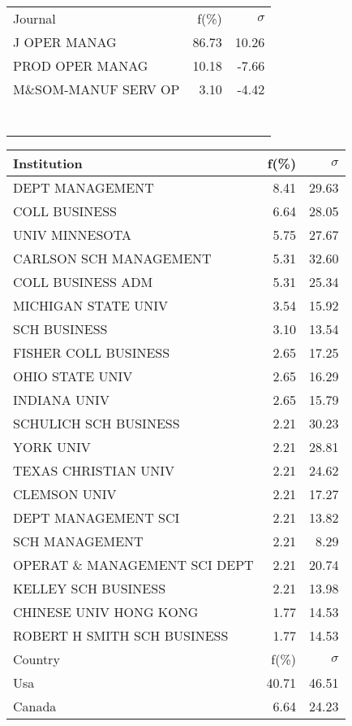 \documentclass[a4paper,11pt]{report}
\begin{document}
\begin{landscape}
\begin{table}[!ht]
{\begin{tabular}{|l r  r|}
 &  & \\
\hline
\hline
Journal & f(\%) & $\sigma$\\
\hline
J OPER MANAG & 86.73 & 10.26\\
PROD OPER MANAG & 10.18 & -7.66\\
M\&SOM-MANUF SERV OP & 3.10 & -4.42\\
 &  & \\
 &  & \\
 &  & \\
 &  & \\
 &  & \\
 &  & \\
 &  & \\
\hline
\end{tabular}
}
{\scriptsize\begin{tabular}{|l r r|}
\hline
Institution & f(\%) & $\sigma$\\
\hline
DEPT MANAGEMENT & 8.41 & 29.63\\
COLL BUSINESS & 6.64 & 28.05\\
UNIV MINNESOTA & 5.75 & 27.67\\
CARLSON SCH MANAGEMENT & 5.31 & 32.60\\
COLL BUSINESS ADM & 5.31 & 25.34\\
MICHIGAN STATE UNIV & 3.54 & 15.92\\
SCH BUSINESS & 3.10 & 13.54\\
FISHER COLL BUSINESS & 2.65 & 17.25\\
OHIO STATE UNIV & 2.65 & 16.29\\
INDIANA UNIV & 2.65 & 15.79\\
SCHULICH SCH BUSINESS & 2.21 & 30.23\\
YORK UNIV & 2.21 & 28.81\\
TEXAS CHRISTIAN UNIV & 2.21 & 24.62\\
CLEMSON UNIV & 2.21 & 17.27\\
DEPT MANAGEMENT SCI & 2.21 & 13.82\\
SCH MANAGEMENT & 2.21 & 8.29\\
OPERAT \& MANAGEMENT SCI DEPT & 2.21 & 20.74\\
KELLEY SCH BUSINESS & 2.21 & 13.98\\
CHINESE UNIV HONG KONG & 1.77 & 14.53\\
ROBERT H SMITH SCH BUSINESS & 1.77 & 14.53\\
\hline
\hline
Country & f(\%) & $\sigma$\\
\hline
Usa & 40.71 & 46.51\\
Canada & 6.64 & 24.23\\

\end{tabular}}
\end{table}
\end{landscape}
\end{document}
